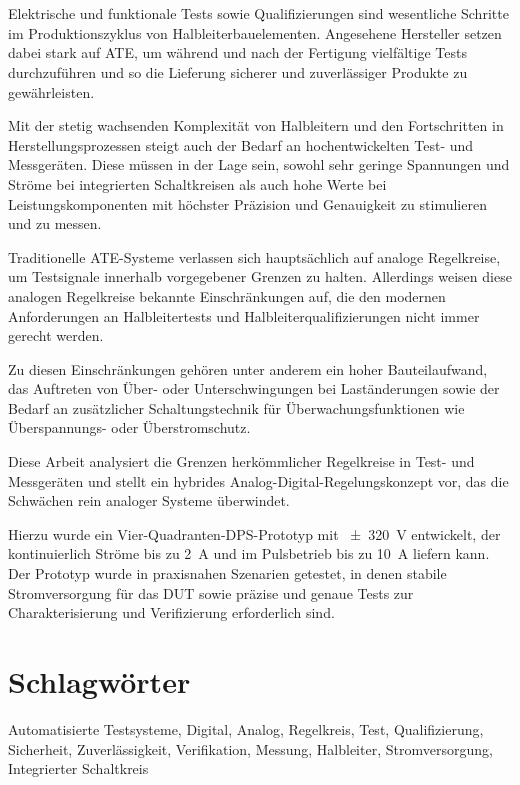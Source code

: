 

\begin{flushleft}
    \section*{\textbf{}}
    \justifying
    \vskip 1cm

    Elektrische und funktionale Tests sowie Qualifizierungen sind
    wesentliche Schritte im Produktionszyklus von Halbleiterbauelementen.
    Angesehene Hersteller setzen dabei stark auf \acs{ATE}, um während und
    nach der Fertigung vielfältige Tests durchzuführen und so die Lieferung
    sicherer und zuverlässiger Produkte zu gewährleisten.

    Mit der stetig wachsenden Komplexität von Halbleitern und den
    Fortschritten in Herstellungsprozessen steigt auch der Bedarf
    an hochentwickelten Test- und Messgeräten.
    Diese müssen in der Lage sein, sowohl sehr geringe
    Spannungen und Ströme bei integrierten Schaltkreisen als auch hohe
    Werte bei Leistungskomponenten mit höchster Präzision und Genauigkeit
    zu stimulieren und zu messen.

    Traditionelle \acs{ATE}-Systeme verlassen sich hauptsächlich auf analoge
    Regelkreise, um Testsignale innerhalb vorgegebener Grenzen zu halten.
    Allerdings weisen diese analogen Regelkreise bekannte Einschränkungen
    auf, die den modernen Anforderungen an Halbleitertests und
    Halbleiterqualifizierungen nicht immer gerecht werden.

    Zu diesen Einschränkungen gehören unter anderem ein hoher
    Bauteilaufwand, das Auftreten von Über- oder Unterschwingungen
    bei Laständerungen sowie der Bedarf an zusätzlicher Schaltungstechnik
    für Überwachungsfunktionen wie Überspannungs- oder Überstromschutz.

    Diese Arbeit analysiert die Grenzen herkömmlicher Regelkreise in Test-
    und Messgeräten und stellt ein hybrides Analog-Digital-Regelungskonzept
    vor, das die Schwächen rein analoger Systeme überwindet.

    Hierzu wurde ein Vier-Quadranten-\acs{DPS}-Prototyp mit
    \SI{\pm320}{\volt} entwickelt, der kontinuierlich Ströme bis zu
    \SI{2}{\ampere} und im Pulsbetrieb bis zu \SI{10}{\ampere} liefern kann.
    Der Prototyp wurde in praxisnahen Szenarien getestet, in denen stabile
    Stromversorgung für das \acs{DUT} sowie präzise und genaue Tests zur
    Charakterisierung und Verifizierung erforderlich sind.

    \vskip 0.45cm
    \section*{\textbf{Schlagwörter}}
    {
    Automatisierte Testsysteme, Digital, Analog, Regelkreis, Test,
    Qualifizierung, Sicherheit, Zuverlässigkeit, Verifikation, Messung,
    Halbleiter, Stromversorgung, Integrierter Schaltkreis
    \par}

\end{flushleft}

